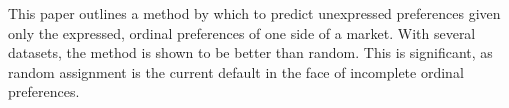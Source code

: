 This paper outlines a method by which to predict unexpressed preferences given only the expressed, ordinal preferences of one side of a market. With several datasets, the method is shown to be better than random. This is significant, as random assignment is the current default in the face of incomplete ordinal preferences. 





